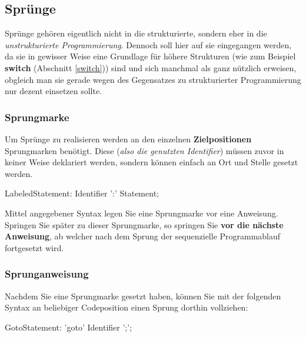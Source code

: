 \documentclass[a4paper]{report}
\begin{document}
\subsection{Sprünge}
Sprünge gehören eigentlich nicht in die strukturierte, sondern eher in die \textit{unstrukturierte Programmierung}. Dennoch soll hier auf sie eingegangen werden, da sie in gewisser Weise eine Grundlage für höhere Strukturen (wie zum Beispiel \textbf{switch} (Abschnitt \ref{switch})) sind und sich manchmal als ganz nützlich erweisen, obgleich man sie gerade wegen des Gegensatzes zu strukturierter Programmierung nur dezent einsetzen sollte. 

\subsubsection{Sprungmarke}
Um Sprünge zu realisieren werden an den einzelnen \textbf{Zielpositionen} Sprungmarken benötigt. Diese (\textit{also die genutzten Identifier}) müssen zuvor in keiner Weise deklariert werden, sondern können einfach an Ort und Stelle gesetzt werden.
\begin{rail}
	LabeledStatement: Identifier ':' Statement;
\end{rail}
Mittel angegebener Syntax legen Sie eine Sprungmarke vor eine Anweisung. Springen Sie später zu dieser Sprungmarke, so springen Sie \textbf{vor die nächste Anweisung}, ab welcher nach dem Sprung der sequenzielle Programmablauf fortgesetzt wird.
\subsubsection{Sprunganweisung}
Nachdem Sie eine Sprungmarke gesetzt haben, können Sie mit der folgenden Syntax an beliebiger Codeposition einen Sprung dorthin vollziehen:
\begin{rail}
	GotoStatement: 'goto' Identifier ';';
\end{rail}
\end{document}

